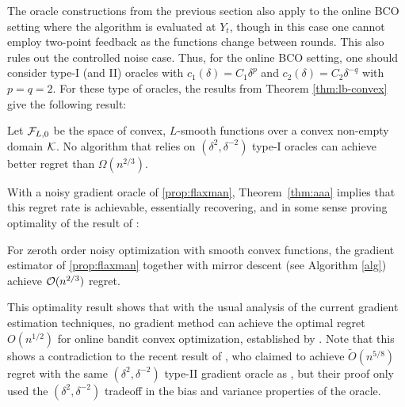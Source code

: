 The oracle constructions from the previous section also apply to the online BCO setting
where the algorithm is evaluated at $Y_t$, though in this case 
one cannot employ two-point feedback as the functions change between rounds. 
This also rules out the controlled noise case. 
Thus, for the online BCO setting, one should consider type-I (and II) oracles with $c_1(\delta) = C_1 \delta^p$ and $c_2(\delta) = C_2\delta^{-q}$ with $p=q=2$.
For these type of oracles, the results from Theorem \ref{thm:lb-convex} give the following result: 
\begin{theorem}\label{thm:aaa}
Let $\mathcal{F}_{L,0}$ be the space of convex, $L$-smooth functions over a convex non-empty domain $\mathcal{K}$.
No algorithm that relies on 
 $(\delta^2,\delta^{-2})$ type-I oracles
 can achieve better regret than $\Omega(n^{2/3})$.
\end{theorem}
\vspace{-0.2cm}
With a noisy gradient oracle of \cref{prop:flaxman}, Theorem~\ref{thm:aaa} implies that this regret rate is achievable, essentially recovering, and in some sense proving optimality of the result of \citet{saha2011improved}:
\begin{theorem}
For zeroth order noisy optimization with smooth convex functions, the gradient estimator of \cref{prop:flaxman} together with mirror descent (see Algorithm \ref{alg}) achieve $\mathcal{O}(n^{2/3})$ regret.
\end{theorem}
\vspace{-0.2cm}
This optimality result shows that with the usual analysis of the current gradient estimation techniques, no gradient method can achieve the optimal regret $O(n^{1/2})$ for online bandit convex optimization, established by \citet{BubeckDKP15,BuEl15}. Note that this shows a contradiction to the recent result of \citet{DeElKo15}, who claimed to achieve $\tilde{O}(n^{5/8})$ regret with the same $(\delta^2,\delta^{-2})$ type-II gradient oracle as \citet{saha2011improved}, but their proof only used the $(\delta^2,\delta^{-2})$ tradeoff in the bias and variance properties of the oracle.





